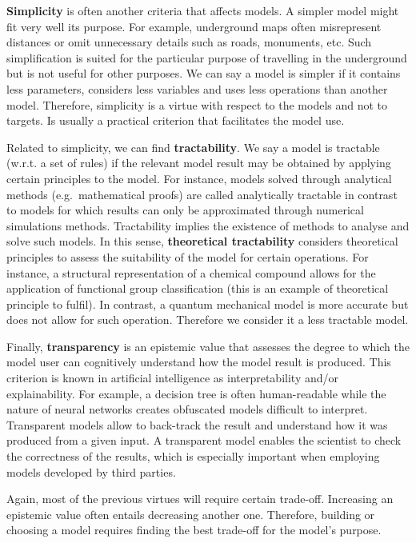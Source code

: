 \documentclass[
  12pt,
]{book}
\begin{document}
\textbf{Simplicity} is often another criteria that affects models. A simpler model might fit very well its purpose. For example, underground maps often misrepresent distances or omit unnecessary details such as roads, monuments, etc. Such simplification is suited for the particular purpose of travelling in the underground but is not useful for other purposes. We can say a model is simpler if it contains less parameters, considers less variables and uses less operations than another model. Therefore, simplicity is a virtue with respect to the models and not to targets. Is usually a practical criterion that facilitates the model use.

Related to simplicity, we can find \textbf{tractability}. We say a model is tractable (w.r.t. a set of rules) if the relevant model result may be obtained by applying certain principles to the model. For instance, models solved through analytical methods (e.g.~mathematical proofs) are called analytically tractable in contrast to models for which results can only be approximated through numerical simulations methods. Tractability implies the existence of methods to analyse and solve such models. In this sense, \textbf{theoretical tractability} considers theoretical principles to assess the suitability of the model for certain operations. For instance, a structural representation of a chemical compound allows for the application of functional group classification (this is an example of theoretical principle to fulfil). In contrast, a quantum mechanical model is more accurate but does not allow for such operation. Therefore we consider it a less tractable model.

Finally, \textbf{transparency} is an epistemic value that assesses the degree to which the model user can cognitively understand how the model result is produced. This criterion is known in artificial intelligence as interpretability and/or explainability. For example, a decision tree is often human-readable while the nature of neural networks creates obfuscated models difficult to interpret. Transparent models allow to back-track the result and understand how it was produced from a given input. A transparent model enables the scientist to check the correctness of the results, which is especially important when employing models developed by third parties.

Again, most of the previous virtues will require certain trade-off. Increasing an epistemic value often entails decreasing another one. Therefore, building or choosing a model requires finding the best trade-off for the model's purpose.
\end{document}
